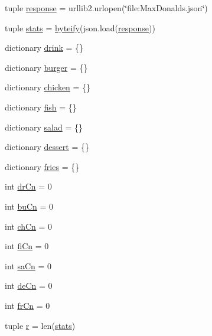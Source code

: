 \begin{DoxyCompactItemize}
\item 
tuple \hyperlink{namespacedataImportTesting_a95c87352eebd9f60ccf454136da78291}{response} = urllib2.\-urlopen(\char`\"{}file\-:\-Max\-Donalds.\-json\char`\"{})
\item 
tuple \hyperlink{namespacedataImportTesting_ae0b8c6e52898295995c6bb0bf028938c}{stats} = \hyperlink{namespacedataImportTesting_acc6c76e1a83fb637f65b1cbab3356e4b}{byteify}(json.\-load(\hyperlink{namespacedataImportTesting_a95c87352eebd9f60ccf454136da78291}{response}))
\item 
dictionary \hyperlink{namespacedataImportTesting_ad91970fb7d7fd60f4fe54adbfb7e6a4b}{drink} = \{\}
\item 
dictionary \hyperlink{namespacedataImportTesting_a5b11c715e25d6425d24dca704f0a8676}{burger} = \{\}
\item 
dictionary \hyperlink{namespacedataImportTesting_a4d7ac133c76e4761200c8568cff1c6ed}{chicken} = \{\}
\item 
dictionary \hyperlink{namespacedataImportTesting_ad4143a6d82f48166af50a5d847d61016}{fish} = \{\}
\item 
dictionary \hyperlink{namespacedataImportTesting_af499d40f6bdb91b736fb75a44d7675e0}{salad} = \{\}
\item 
dictionary \hyperlink{namespacedataImportTesting_a1ef0d0854303f87407db65707459891a}{dessert} = \{\}
\item 
dictionary \hyperlink{namespacedataImportTesting_a9c0b1c57b42b00d8f28ad6e1d95a7b5d}{fries} = \{\}
\item 
int \hyperlink{namespacedataImportTesting_a9dcd754b628562646578f53260ef21b3}{dr\-Cn} = 0
\item 
int \hyperlink{namespacedataImportTesting_a39eb1b7d8034d8510eb896d440b91585}{bu\-Cn} = 0
\item 
int \hyperlink{namespacedataImportTesting_a51b52c546e3213eab15e8b7f8d9bff15}{ch\-Cn} = 0
\item 
int \hyperlink{namespacedataImportTesting_a29ff5fc73f80b04dee9840edd4480bb8}{fi\-Cn} = 0
\item 
int \hyperlink{namespacedataImportTesting_adf726ee7682fceb53d621a9eb9c13ff7}{sa\-Cn} = 0
\item 
int \hyperlink{namespacedataImportTesting_a5ece02faad1e1d416f59cfc4765c5f19}{de\-Cn} = 0
\item 
int \hyperlink{namespacedataImportTesting_a3d7d25d33bb5b2b1ff1a46c7c2fc321c}{fr\-Cn} = 0
\item 
tuple \hyperlink{namespacedataImportTesting_a5be936dd65a231ffe248664d9904f718}{r} = len(\hyperlink{namespacedataImportTesting_ae0b8c6e52898295995c6bb0bf028938c}{stats})
\end{DoxyCompactItemize}


